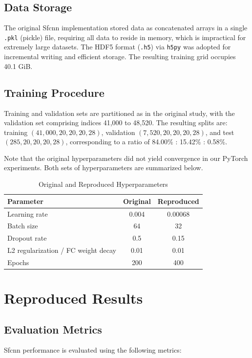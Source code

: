 \documentclass[unnumsec,webpdf,contemporary,large]{oup-authoring-template}
\theoremstyle{thmstyleone}%
\theoremstyle{thmstyletwo}%
\theoremstyle{thmstylethree}%
\begin{document}
\subsection{Data Storage}
The original Sfcnn implementation stored data as concatenated arrays in a single \texttt{.pkl} (pickle) file, requiring all data to reside in memory, which is impractical for extremely large datasets. The HDF5 format (\texttt{.h5}) via \texttt{h5py} was adopted for incremental writing and efficient storage. The resulting training grid occupies 40.1 GiB.

\subsection{Training Procedure}
Training and validation sets are partitioned as in the original study, with the validation set comprising indices 41,000 to 48,520. The resulting splits are: training $(41,000, 20,20,20,28)$, validation $(7,520, 20,20,20,28)$, and test $(285, 20,20,20,28)$, corresponding to a ratio of 84.00\% : 15.42\% : 0.58\%. 

Note that the original hyperparameters did not yield convergence in our PyTorch experiments. Both sets of hyperparameters are summarized below.

\begin{table}[H]
\centering
\caption{Original and Reproduced Hyperparameters}
\label{tab:hyperparams}
\begin{tabular}{lcc}
\toprule
Parameter & Original & Reproduced \\
\midrule
Learning rate & 0.004 & 0.00068 \\
Batch size & 64 & 32 \\
Dropout rate & 0.5 & 0.15 \\
L2 regularization / FC weight decay & 0.01 & 0.01 \\
Epochs & 200 & 400 \\
\bottomrule
\end{tabular}
\end{table}

\section{Reproduced Results}
\label{sec:ReproducedResults}

\subsection{Evaluation Metrics}
Sfcnn performance is evaluated using the following metrics:
\end{document}
